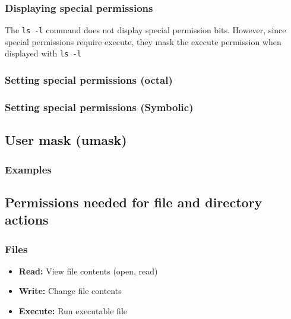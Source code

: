 \documentclass{report}
\begin{document}
    \bigbreak \noindent 
    \subsubsection{Displaying special permissions}
    \bigbreak \noindent 
    \begin{concept}
        The \texttt{ls -l}  command does not display special permission bits. However, since special permissions require execute, they mask the execute permission when displayed with \texttt{ls -l}
    \end{concept}

    \bigbreak \noindent 
    \subsubsection{Setting special permissions (octal)}
    \bigbreak \noindent 

    \pagebreak 
    \subsubsection{Setting special permissions (Symbolic)}
    \bigbreak \noindent 

    \bigbreak \noindent 
    \subsection{User mask (umask)}
    \bigbreak \noindent 

    \pagebreak 
    \subsubsection{Examples}
    \bigbreak \noindent 

    \bigbreak \noindent 
    \subsection{Permissions needed for file and directory actions}
    \bigbreak \noindent 
    \subsubsection{Files}
    \begin{itemize}
        \item \textbf{Read:} View file contents (open, read)
        \item \textbf{Write:} Change file contents
        \item \textbf{Execute:} Run executable file
    \end{itemize}
\end{document}
